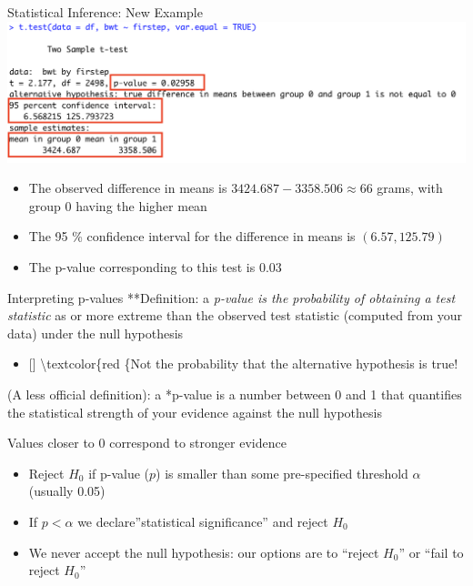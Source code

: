 \documentclass[
  ignorenonframetext,
]{beamer}
\providecommand{\tightlist}{%
  \setlength{\itemsep}{0pt}\setlength{\parskip}{0pt}}
\begin{document}
\begin{frame}{Statistical Inference: New Example}
\protect\hypertarget{statistical-inference-new-example-10}{}
\includegraphics{ttest4.png}

\begin{itemize}
\tightlist
\item
  The observed difference in means is \(3424.687- 3358.506 \approx 66\)
  grams, with group \(0\) having the higher mean
\item
  The 95 \% confidence interval for the difference in means is
  \((6.57, 125.79)\)
\item
  The p-value corresponding to this test is \(0.03\)
\end{itemize}
\end{frame}

\begin{frame}{Interpreting p-values}
\protect\hypertarget{interpreting-p-values}{}
**Definition: a \emph{p-value is the probability of obtaining a test
statistic }as or more extreme than the observed test statistic (computed
from your data) under the null hypothesis

\begin{itemize}
\tightlist
\item
  {[}{]} \textbackslash textcolor\{red \{Not the probability that the
  alternative hypothesis is true!
\end{itemize}

(A less official definition): a *p-value is a number between 0 and 1
that quantifies the statistical strength of your evidence against the
null hypothesis

Values closer to 0 correspond to stronger evidence

\begin{itemize}
\tightlist
\item
  Reject \(H_0\) if p-value (\(p\)) is smaller than some pre-specified
  threshold \(\alpha\) (usually 0.05)
\item
  If \(p < \alpha\) we declare''statistical significance'' and reject
  \(H_0\)
\item
  {We never accept the null hypothesis}: our options are to ``reject
  \(H_0\)'' or ``fail to reject \(H_0\)''
\end{itemize}
\end{frame}
\end{document}
